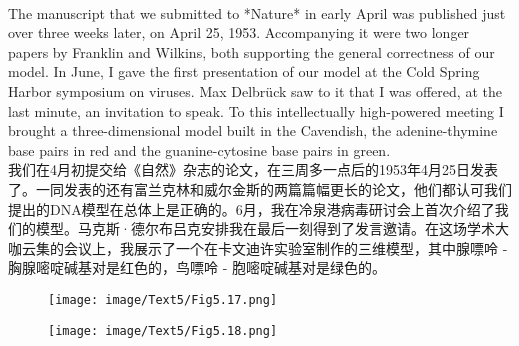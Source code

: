 \documentclass{article}
\begin{document}
\\
The manuscript that we submitted to *Nature* in early April was published just over three weeks later, on April 25, 1953. Accompanying it were two longer papers by Franklin and Wilkins, both supporting the general correctness of our model. In June, I gave the first presentation of our model at the Cold Spring Harbor symposium on viruses. Max Delbrück saw to it that I was offered, at the last minute, an invitation to speak. To this intellectually high-powered meeting I brought a three-dimensional model built in the Cavendish, the adenine-thymine base pairs in red and the guanine-cytosine base pairs in green.\\
我们在4月初提交给《自然》杂志的论文，在三周多一点后的1953年4月25日发表了。一同发表的还有富兰克林和威尔金斯的两篇篇幅更长的论文，他们都认可我们提出的DNA模型在总体上是正确的。6月，我在冷泉港病毒研讨会上首次介绍了我们的模型。马克斯·德尔布吕克安排我在最后一刻得到了发言邀请。在这场学术大咖云集的会议上，我展示了一个在卡文迪许实验室制作的三维模型，其中腺嘌呤 - 胸腺嘧啶碱基对是红色的，鸟嘌呤 - 胞嘧啶碱基对是绿色的。 \\

\begin{figure}
    \centering
    \texttt{[image: image/Text5/Fig5.17.png]}
\end{figure}

\begin{figure}
    \centering
    \texttt{[image: image/Text5/Fig5.18.png]}
\end{figure}
\end{document}
